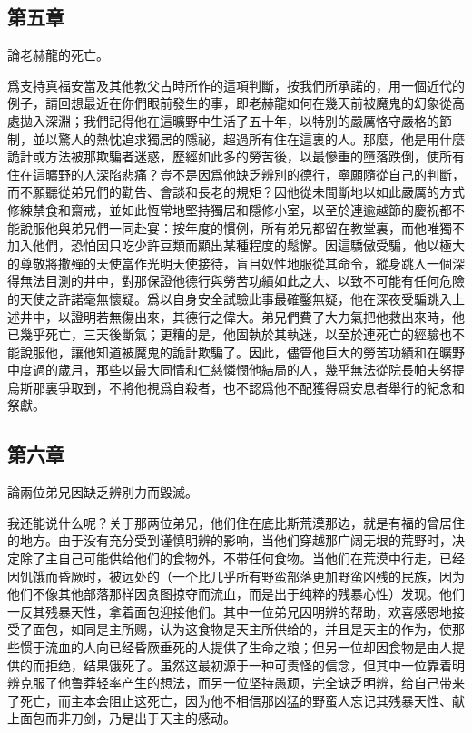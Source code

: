 
\subsection{第五章}

論老赫龍的死亡。\par

爲支持真福安當及其他教父古時所作的這項判斷，按我們所承諾的，用一個近代的例子，請回想最近在你們眼前發生的事，即老赫龍如何在幾天前被魔鬼的幻象從高處拋入深淵；我們記得他在這曠野中生活了五十年，以特別的嚴厲恪守嚴格的節制，並以驚人的熱忱追求獨居的隱祕，超過所有住在這裏的人。那麼，他是用什麼詭計或方法被那欺騙者迷惑，歷經如此多的勞苦後，以最慘重的墮落跌倒，使所有住在這曠野的人深陷悲痛？豈不是因爲他缺乏辨別的德行，寧願隨從自己的判斷，而不願聽從弟兄們的勸告、會談和長老的規矩？因他從未間斷地以如此嚴厲的方式修練禁食和齋戒，並如此恆常地堅持獨居和隱修小室，以至於連逾越節的慶祝都不能說服他與弟兄們一同赴宴：按年度的慣例，所有弟兄都留在教堂裏，而他唯獨不加入他們，恐怕因只吃少許豆類而顯出某種程度的鬆懈。因這驕傲受騙，他以極大的尊敬將撒殫的天使當作光明天使接待，盲目奴性地服從其命令，縱身跳入一個深得無法目測的井中，對那保證他德行與勞苦功績如此之大、以致不可能有任何危險的天使之許諾毫無懷疑。爲以自身安全試驗此事最確鑿無疑，他在深夜受騙跳入上述井中，以證明若無傷出來，其德行之偉大。弟兄們費了大力氣把他救出來時，他已幾乎死亡，三天後斷氣；更糟的是，他固執於其執迷，以至於連死亡的經驗也不能說服他，讓他知道被魔鬼的詭計欺騙了。因此，儘管他巨大的勞苦功績和在曠野中度過的歲月，那些以最大同情和仁慈憐憫他結局的人，幾乎無法從院長帕夫努提烏斯那裏爭取到，不將他視爲自殺者，也不認爲他不配獲得爲安息者舉行的紀念和祭獻。\par


\subsection{第六章}

論兩位弟兄因缺乏辨別力而毀滅。\par

我还能说什么呢？关于那两位弟兄，他们住在底比斯荒漠那边，就是有福的曾居住的地方。由于没有充分受到谨慎明辨的影响，当他们穿越那广阔无垠的荒野时，决定除了主自己可能供给他们的食物外，不带任何食物。当他们在荒漠中行走，已经因饥饿而昏厥时，被远处的（一个比几乎所有野蛮部落更加野蛮凶残的民族，因为他们不像其他部落那样因贪图掠夺而流血，而是出于纯粹的残暴心性）发现。他们一反其残暴天性，拿着面包迎接他们。其中一位弟兄因明辨的帮助，欢喜感恩地接受了面包，如同是主所赐，认为这食物是天主所供给的，并且是天主的作为，使那些惯于流血的人向已经昏厥垂死的人提供了生命之粮；但另一位却因食物是由人提供的而拒绝，结果饿死了。虽然这最初源于一种可责怪的信念，但其中一位靠着明辨克服了他鲁莽轻率产生的想法，而另一位坚持愚顽，完全缺乏明辨，给自己带来了死亡，而主本会阻止这死亡，因为他不相信那凶猛的野蛮人忘记其残暴天性、献上面包而非刀剑，乃是出于天主的感动。\par

